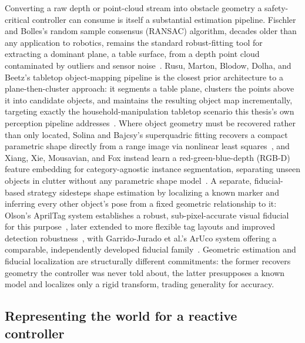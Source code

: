 \documentclass[12pt,a4paper,twoside,openright]{report}
\begin{document}
Converting a raw depth or point-cloud stream into obstacle geometry a safety-critical controller can consume is itself a substantial estimation pipeline. Fischler and Bolles's random sample consensus (RANSAC) algorithm, decades older than any application to robotics, remains the standard robust-fitting tool for extracting a dominant plane, a table surface, from a depth point cloud contaminated by outliers and sensor noise~\cite{fischler1981ransac}. Rusu, Marton, Blodow, Dolha, and Beetz's tabletop object-mapping pipeline is the closest prior architecture to a plane-then-cluster approach: it segments a table plane, clusters the points above it into candidate objects, and maintains the resulting object map incrementally, targeting exactly the household-manipulation tabletop scenario this thesis's own perception pipeline addresses~\cite{rusu2008tabletop}. Where object geometry must be recovered rather than only located, Solina and Bajcsy's superquadric fitting recovers a compact parametric shape directly from a range image via nonlinear least squares~\cite{solina1990superquadrics}, and Xiang, Xie, Mousavian, and Fox instead learn a red-green-blue-depth (RGB-D) feature embedding for category-agnostic instance segmentation, separating unseen objects in clutter without any parametric shape model~\cite{xiang2020unseenseg}. A separate, fiducial-based strategy sidesteps shape estimation by localizing a known marker and inferring every other object's pose from a fixed geometric relationship to it: Olson's AprilTag system establishes a robust, sub-pixel-accurate visual fiducial for this purpose~\cite{olson2011apriltag}, later extended to more flexible tag layouts and improved detection robustness~\cite{krogius2019apriltag3}, with Garrido-Jurado et al.'s ArUco system offering a comparable, independently developed fiducial family~\cite{garridojurado2014aruco}. Geometric estimation and fiducial localization are structurally different commitments: the former recovers geometry the controller was never told about, the latter presupposes a known model and localizes only a rigid transform, trading generality for accuracy.

\subsection{Representing the world for a reactive controller}
\label{sec:sota-world-representation}
\end{document}
